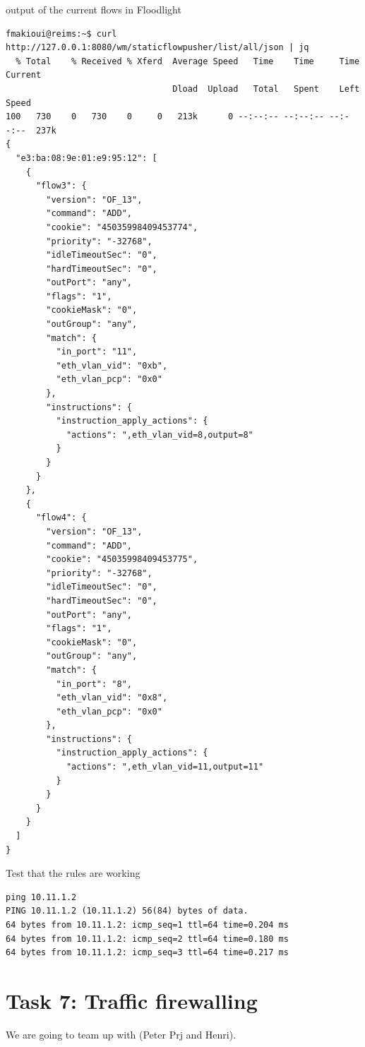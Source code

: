 \documentclass[a4paper]{article}
\begin{document}
output of the current flows in Floodlight
\begin{verbatim}
fmakioui@reims:~$ curl http://127.0.0.1:8080/wm/staticflowpusher/list/all/json | jq
  % Total    % Received % Xferd  Average Speed   Time    Time     Time  Current
                                 Dload  Upload   Total   Spent    Left  Speed
100   730    0   730    0     0   213k      0 --:--:-- --:--:-- --:--:--  237k
{
  "e3:ba:08:9e:01:e9:95:12": [
    {
      "flow3": {
        "version": "OF_13",
        "command": "ADD",
        "cookie": "45035998409453774",
        "priority": "-32768",
        "idleTimeoutSec": "0",
        "hardTimeoutSec": "0",
        "outPort": "any",
        "flags": "1",
        "cookieMask": "0",
        "outGroup": "any",
        "match": {
          "in_port": "11",
          "eth_vlan_vid": "0xb",
          "eth_vlan_pcp": "0x0"
        },
        "instructions": {
          "instruction_apply_actions": {
            "actions": ",eth_vlan_vid=8,output=8"
          }
        }
      }
    },
    {
      "flow4": {
        "version": "OF_13",
        "command": "ADD",
        "cookie": "45035998409453775",
        "priority": "-32768",
        "idleTimeoutSec": "0",
        "hardTimeoutSec": "0",
        "outPort": "any",
        "flags": "1",
        "cookieMask": "0",
        "outGroup": "any",
        "match": {
          "in_port": "8",
          "eth_vlan_vid": "0x8",
          "eth_vlan_pcp": "0x0"
        },
        "instructions": {
          "instruction_apply_actions": {
            "actions": ",eth_vlan_vid=11,output=11"
          }
        }
      }
    }
  ]
}

\end{verbatim}

Test that the rules are working

\begin{verbatim}
ping 10.11.1.2
PING 10.11.1.2 (10.11.1.2) 56(84) bytes of data.
64 bytes from 10.11.1.2: icmp_seq=1 ttl=64 time=0.204 ms
64 bytes from 10.11.1.2: icmp_seq=2 ttl=64 time=0.180 ms
64 bytes from 10.11.1.2: icmp_seq=3 ttl=64 time=0.217 ms

\end{verbatim}


\newpage
\section{Task 7: Traffic firewalling}

We are going to team up with (Peter Prj and Henri).
\end{document}
